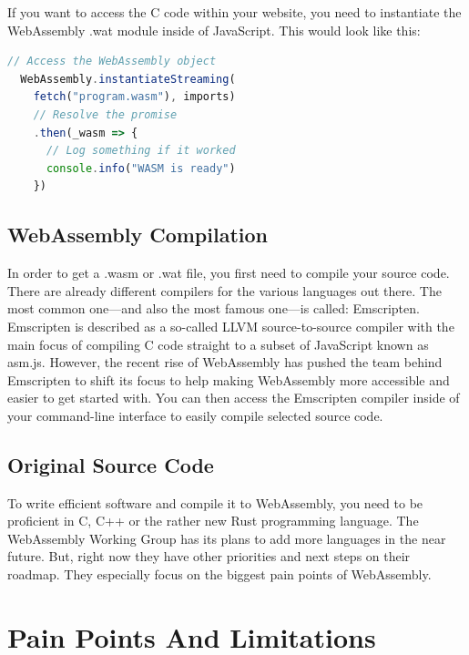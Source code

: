 \documentclass[10pt]{article}
\begin{document}
\begin{sloppypar}
  If you want to access the C code within your website, you need to instantiate the WebAssembly .wat module inside of JavaScript. This would look like this:

  \vspace{7pt}
  \begin{lstlisting}[language=JavaScript, caption=Instantiate the .wasm module in JavaScript., label=lst:javascript-example]
  // Access the WebAssembly object
  WebAssembly.instantiateStreaming(
    fetch("program.wasm"), imports)
    // Resolve the promise
    .then(_wasm => {
      // Log something if it worked
      console.info("WASM is ready")
    })\end{lstlisting}

  \subsection{WebAssembly Compilation}
  \label{sec:webassembly-compilation}

  In order to get a .wasm or .wat file, you first need to compile your source code. There are already different compilers for the various languages out there. The most common one—and also the most famous one—is called: Emscripten. Emscripten is described as a so-called LLVM source-to-source compiler with the main focus of compiling C code straight to a subset of JavaScript known as asm.js. However, the recent rise of WebAssembly has pushed the team behind Emscripten to shift its focus to help making WebAssembly more accessible and easier to get started with. You can then access the Emscripten compiler inside of your command-line interface to easily compile selected source code.

  \subsection{Original Source Code}
  \label{sec:original-source-code}

  To write efficient software and compile it to WebAssembly, you need to be proficient in C, C++ or the rather new Rust programming language. The WebAssembly Working Group has its plans to add more languages in the near future. But, right now they have other priorities and next steps on their roadmap. They especially focus on the biggest pain points of WebAssembly.

  \section{Pain Points And Limitations}
  \label{sec:pain-points-and-limitations}


\end{sloppypar}
\end{document}
